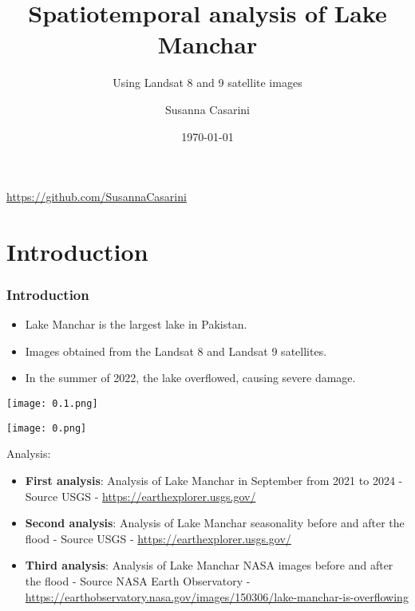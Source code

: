 \documentclass{beamer}
\title{Spatiotemporal analysis of Lake Manchar}
\subtitle{Using Landsat 8 and 9 satellite images}
\author{Susanna Casarini}
\date{\today}
\begin{document}
\begin{frame}
  \titlepage
  \centering
  \href{https://github.com/SusannaCasarini}{https://github.com/SusannaCasarini}  

\end{frame}

\section{Introduction}
\begin{frame}
  \frametitle{\small Introduction}
  
  \begin{itemize}
      \item \small Lake Manchar is the largest lake in Pakistan.
      \item \small Images obtained from the Landsat 8 and Landsat 9 satellites.
      \item \small In the summer of 2022, the lake overflowed, causing severe damage.
  \end{itemize}

    \hspace{1cm}
  
  \begin{minipage}{0.48\textwidth}
    \centering
    \texttt{[image: 0.1.png]}
    \caption{}
  \end{minipage}
  \hfill
  \begin{minipage}{0.48\textwidth}
    \centering
    \texttt{[image: 0.png]}
  \end{minipage}
  
 \end{frame}  
 
\begin{frame}
    \small Analysis:
    \begin{itemize}
        \item \small \textbf{First analysis}: Analysis of Lake Manchar in September from 2021 to 2024 - Source USGS - \href{https://earthexplorer.usgs.gov/}{https://earthexplorer.usgs.gov/}
        \item \small \textbf{Second analysis}: Analysis of Lake Manchar seasonality before and after the flood - Source USGS - \href{https://earthexplorer.usgs.gov/}{https://earthexplorer.usgs.gov/}
        \item \small \textbf{Third analysis}: Analysis of Lake Manchar NASA images before and after the flood - Source NASA Earth Observatory - \href{https://earthobservatory.nasa.gov/images/150306/lake-manchar-is-overflowing}{https://earthobservatory.nasa.gov/images/150306/lake-manchar-is-overflowing}
    \end{itemize}
\end{frame}
\end{document}
